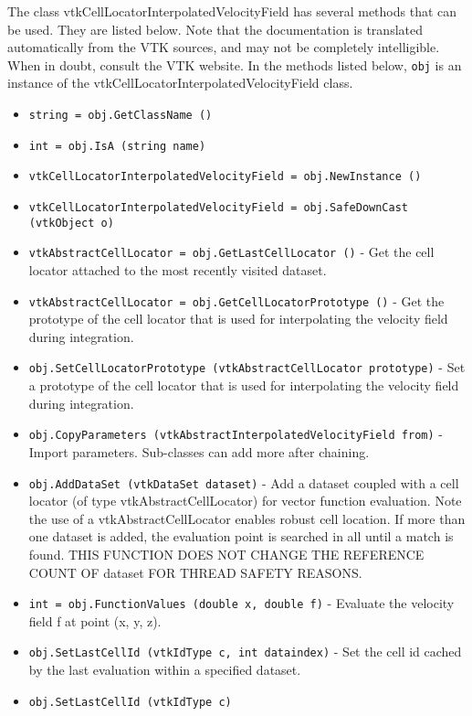 The class vtkCellLocatorInterpolatedVelocityField has several methods that can be used.
  They are listed below.
Note that the documentation is translated automatically from the VTK sources,
and may not be completely intelligible.  When in doubt, consult the VTK website.
In the methods listed below, \verb|obj| is an instance of the vtkCellLocatorInterpolatedVelocityField class.
\begin{itemize}
\item  \verb|string = obj.GetClassName ()|

\item  \verb|int = obj.IsA (string name)|

\item  \verb|vtkCellLocatorInterpolatedVelocityField = obj.NewInstance ()|

\item  \verb|vtkCellLocatorInterpolatedVelocityField = obj.SafeDownCast (vtkObject o)|

\item  \verb|vtkAbstractCellLocator = obj.GetLastCellLocator ()| -  Get the cell locator attached to the most recently visited dataset.

\item  \verb|vtkAbstractCellLocator = obj.GetCellLocatorPrototype ()| -  Get the prototype of the cell locator that is used for interpolating the
 velocity field during integration.

\item  \verb|obj.SetCellLocatorPrototype (vtkAbstractCellLocator prototype)| -  Set a prototype of the cell locator that is used for interpolating the 
 velocity field during integration.

\item  \verb|obj.CopyParameters (vtkAbstractInterpolatedVelocityField from)| -  Import parameters. Sub-classes can add more after chaining.

\item  \verb|obj.AddDataSet (vtkDataSet dataset)| -  Add a dataset coupled with a cell locator (of type vtkAbstractCellLocator)
 for vector function evaluation. Note the use of a vtkAbstractCellLocator 
 enables robust cell location. If more than one dataset is added, the 
 evaluation point is searched in all until a match is found. THIS FUNCTION
 DOES NOT CHANGE THE REFERENCE COUNT OF dataset FOR THREAD SAFETY REASONS.

\item  \verb|int = obj.FunctionValues (double x, double f)| -  Evaluate the velocity field f at point (x, y, z).

\item  \verb|obj.SetLastCellId (vtkIdType c, int dataindex)| -  Set the cell id cached by the last evaluation within a specified dataset.

\item  \verb|obj.SetLastCellId (vtkIdType c)|

\end{itemize}

